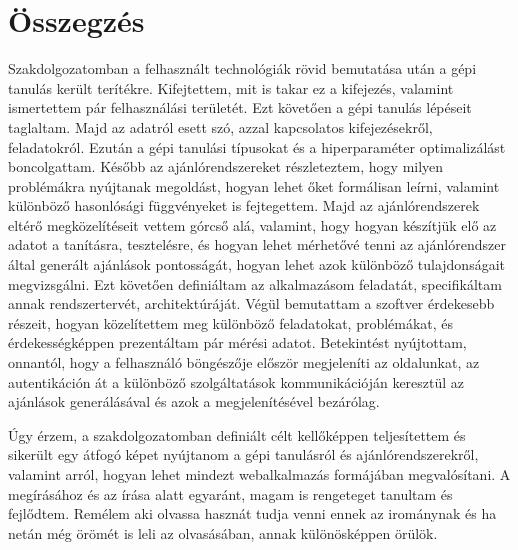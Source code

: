 \documentclass[
]{thesis-ekf}
\theoremstyle{definition}
\theoremstyle{remark}
\begin{document}
\chapter*{Összegzés}
Szakdolgozatomban a felhasznált technológiák rövid bemutatása után a gépi tanulás került terítékre. Kifejtettem, mit is takar ez a kifejezés, valamint ismertettem pár felhasználási területét. Ezt követően a gépi tanulás lépéseit taglaltam. Majd az adatról esett szó, azzal kapcsolatos kifejezésekről, feladatokról. Ezután a gépi tanulási típusokat és a hiperparaméter optimalizálást boncolgattam. Később az ajánlórendszereket részleteztem, hogy milyen problémákra nyújtanak megoldást, hogyan lehet őket formálisan leírni, valamint különböző hasonlósági függvényeket is fejtegettem. Majd az ajánlórendszerek eltérő megközelítéseit vettem górcső alá, valamint, hogy hogyan készítjük elő az adatot a tanításra, tesztelésre, és hogyan lehet mérhetővé tenni az ajánlórendszer által generált ajánlások pontosságát, hogyan lehet azok különböző tulajdonságait megvizsgálni. Ezt követően definiáltam az alkalmazásom feladatát, specifikáltam annak rendszertervét, architektúráját. Végül bemutattam a szoftver érdekesebb részeit, hogyan közelítettem meg különböző feladatokat, problémákat, és érdekességképpen prezentáltam pár mérési adatot. Betekintést nyújtottam, onnantól, hogy a felhasználó böngészője először megjeleníti az oldalunkat, az autentikáción át a különböző szolgáltatások kommunikációján keresztül az ajánlások generálásával és azok a megjelenítésével bezárólag.

Úgy érzem, a szakdolgozatomban definiált célt kellőképpen teljesítettem és sikerült egy átfogó képet nyújtanom a gépi tanulásról és ajánlórendszerekről, valamint arról, hogyan lehet mindezt webalkalmazás formájában megvalósítani. A megírásához és az írása alatt egyaránt, magam is rengeteget tanultam és fejlődtem. Remélem aki olvassa hasznát tudja venni ennek az irománynak és ha netán még örömét is leli az olvasásában, annak különösképpen örülök.
\end{document}

